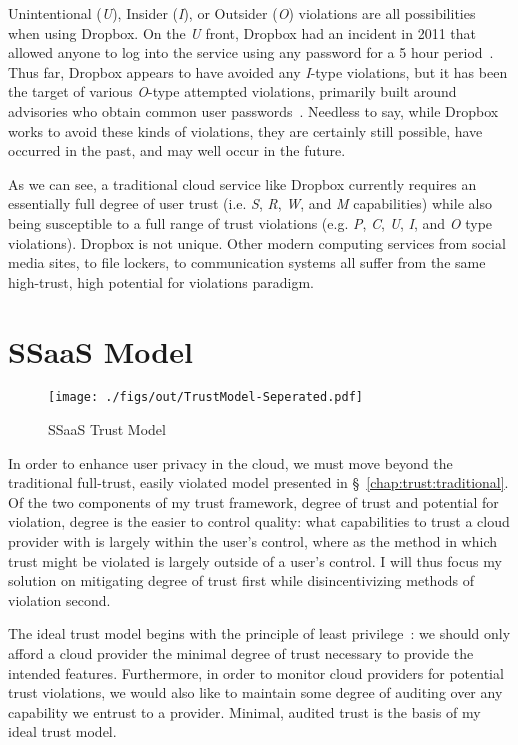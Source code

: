 Unintentional (\emph{U}), Insider (\emph{I}), or Outsider (\emph{O})
violations are all possibilities when using Dropbox. On the \emph{U}
front, Dropbox had an incident in 2011 that allowed anyone to log into
the service using any password for a 5 hour
period~\cite{dropbox-authbug}. Thus far, Dropbox appears to have
avoided any \emph{I}-type violations, but it has been the target of
various \emph{O}-type attempted violations, primarily built around
advisories who obtain common user
passwords~\cite{dropbox-passwords}. Needless to say, while Dropbox
works to avoid these kinds of violations, they are certainly still
possible, have occurred in the past, and may well occur in the future.

As we can see, a traditional cloud service like Dropbox currently
requires an essentially full degree of user trust (i.e. \emph{S},
\emph{R}, \emph{W}, and \emph{M} capabilities) while also being
susceptible to a full range of trust violations (e.g. \emph{P},
\emph{C}, \emph{U}, \emph{I}, and \emph{O} type violations). Dropbox
is not unique. Other modern computing services from social media
sites, to file lockers, to communication systems all suffer from the
same high-trust, high potential for violations paradigm.

\section{SSaaS Model}
\label{chap:trust:ssaas}

\begin{figure}[t]
  \centering
  \texttt{[image: ./figs/out/TrustModel-Seperated.pdf]}
  \caption{SSaaS Trust Model}
  \label{fig:trust-ssaas}
\end{figure}

In order to enhance user privacy in the cloud, we must move beyond the
traditional full-trust, easily violated model presented in
\S~\ref{chap:trust:traditional}. Of the two components of my trust
framework, degree of trust and potential for violation, degree is the
easier to control quality: what capabilities to trust a cloud provider
with is largely within the user's control, where as the method in
which trust might be violated is largely outside of a user's
control. I will thus focus my solution on mitigating degree of trust
first while disincentivizing methods of violation second.

The ideal trust model begins with the principle of least
privilege~\cite{saltzer1975}: we should only afford a cloud provider
the minimal degree of trust necessary to provide the intended
features. Furthermore, in order to monitor cloud providers for
potential trust violations, we would also like to maintain some degree
of auditing over any capability we entrust to a provider. Minimal,
audited trust is the basis of my ideal trust model.

